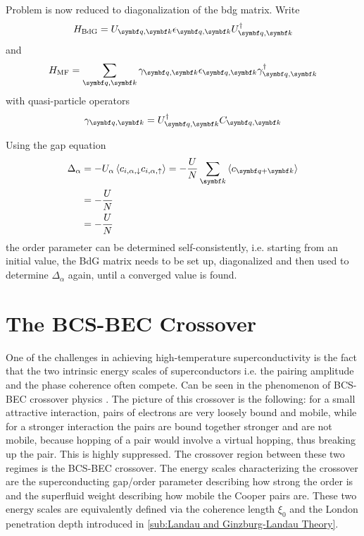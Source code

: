 \documentclass[../notes.tex]{subfiles}
\begin{document}
Problem is  now reduced to diagonalization of the \acrshort{bdg} matrix.
Write
\begin{equation}
	H_{\mathrm{BdG}} = U_{\vb{q}, \vb{k}} \epsilon_{\vb{q}, \vb{k}} U_{\vb{q}, \vb{k}}^{\dagger}
\end{equation}
and 
\begin{equation}
	H_{\mathrm{MF}} = \sum_{\vb{q}, \vb{k}} \gamma_{\vb{q}, \vb{k}} \epsilon_{\vb{q}, \vb{k}} \gamma_{\vb{q}, \vb{k}}^{\dagger}
\end{equation}
with quasi-particle operators
\begin{equation}
	\gamma_{\vb{q}, \vb{k}} = U_{\vb{q}, \vb{k}}^{\dagger} C_{\vb{q}, \vb{k}}
\end{equation}


Using the gap equation
\begin{align}
	\Delta_{\alpha} &= -U_{\alpha} \braket{c_{i, \alpha, \downarrow} c_{i, \alpha, \uparrow}} = -\frac{U}{N} \sum_{\vb{k}} \braket{c_{\vb{q}+\vb{k}}} \nonumber \\
	&= -\frac{U}{N} \\
	&= -\frac{U}{N} \nonumber
\end{align}
the order parameter can be determined self-consistently, i.e. starting from an initial value, the BdG matrix needs to be set up, diagonalized and then used to determine \(\Delta_{\alpha}\) again, until a converged value is found.


\section{The BCS-BEC Crossover}\label{sec:BCS-BEC crossover}

One of the challenges in achieving high-temperature superconductivity is the fact that the two intrinsic energy scales of superconductors i.e. the pairing amplitude and the phase coherence often compete.
Can be seen in the phenomenon of BCS-BEC crossover physics \cite{chenWhenSuperconductivityCrosses2024}.
The picture of this crossover is the following: for a small attractive interaction, pairs of electrons are very loosely bound and mobile, while for a stronger interaction the pairs are bound together stronger and are not mobile, because hopping of a pair would involve a virtual hopping, thus breaking up the pair.
This is highly suppressed.
The crossover region between these two regimes is the BCS-BEC crossover.
The energy scales characterizing the crossover are the superconducting gap/order parameter describing how strong the order is and the superfluid weight describing how mobile the Cooper pairs are.
These two energy scales are equivalently defined via the coherence length \(\xi_0\) and the London penetration depth introduced in \cref{sub:Landau and Ginzburg-Landau Theory}.
\end{document}

